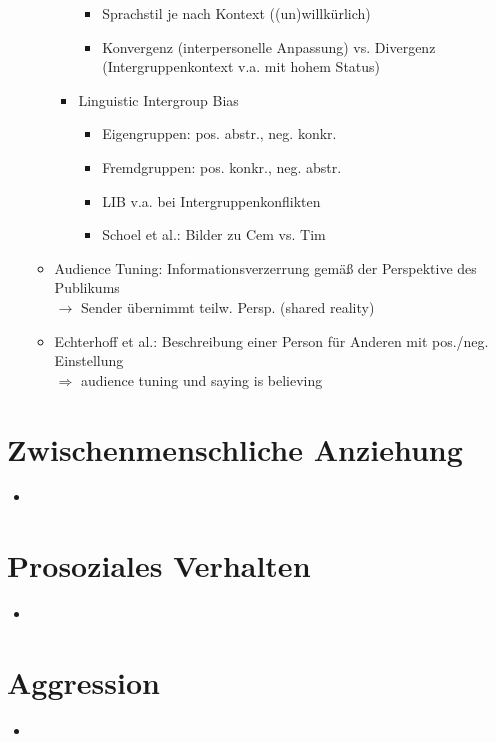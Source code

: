 \documentclass[11pt, paper=a4, twocolumn]{scrartcl}
\begin{document}
\begin{itemize}
\begin{itemize}
\begin{itemize}
								\begin{itemize}
									\item Sprachstil je nach Kontext ((un)willkürlich)
									\item Konvergenz (interpersonelle Anpassung) vs. Divergenz (Intergruppenkontext 
										v.a. mit hohem Status)
								\end{itemize}
							\item Linguistic Intergroup Bias
								\begin{itemize}
									\item Eigengruppen: pos. abstr., neg. konkr.
									\item Fremdgruppen: pos. konkr., neg. abstr.
									\item LIB v.a. bei Intergruppenkonflikten
									\item Schoel et al.: Bilder zu Cem vs. Tim
								\end{itemize}
						\end{itemize}
					\item Audience Tuning: Informationsverzerrung gemäß der Perspektive des Publikums\\
						$\rightarrow$ Sender übernimmt teilw. Persp. (shared reality)
					\item Echterhoff et al.: Beschreibung einer Person für Anderen mit pos./neg. Einstellung\\
						$\Rightarrow$ audience tuning und saying is believing
				\end{itemize}
		\end{itemize}


	\section{Zwischenmenschliche Anziehung}
		\begin{itemize}
			\item
		\end{itemize}



	\section{Prosoziales Verhalten}
		\begin{itemize}
			\item
		\end{itemize}



	\section{Aggression}
		\begin{itemize}
			\item
		\end{itemize}
\end{document}
